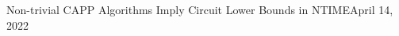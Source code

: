 \begin{lecture}{12}{Non-trivial CAPP Algorithms Imply Circuit Lower Bounds in NTIME}{April 14, 2022}\label{lec:12}
\end{lecture}
